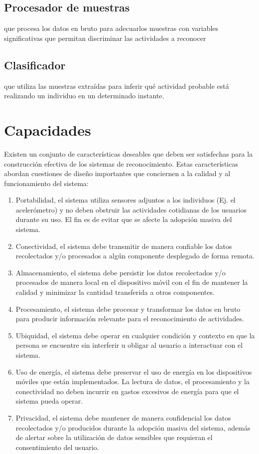 \subsection{Procesador de muestras}

que procesa los datos en bruto para adecuarlos muestras con variables
significativas que permitan discriminar las actividades a reconocer

\subsection{Clasificador}

que utiliza las muestras extraídas para inferir qué actividad probable
está realizando un individuo en un determinado instante.

\section{Capacidades}

Existen un conjunto de características deseables que deben ser satisfechas
para la construcción efectiva de los sistemas de reconocimiento. Estas
características abordan cuestiones de diseño importantes que conciernen
a la calidad y al funcionamiento del sistema:
\begin{enumerate}
\item Portabilidad, el sistema utiliza sensores adjuntos a los individuos
(Ej. el acelerómetro) y no deben obstruir las actividades cotidianas
de los usuarios durante su uso. El fin es de evitar que se afecte
la adopción masiva del sistema. 
\item Conectividad, el sistema debe transmitir de manera confiable los datos
recolectados y/o procesados a algún componente desplegado de forma
remota. 
\item Almacenamiento, el sistema debe persistir los datos recolectados y/o
procesados de manera local en el dispositivo móvil con el fin de mantener
la calidad y minimizar la cantidad transferida a otros componentes.
\item Procesamiento, el sistema debe procesar y transformar los datos en
bruto para producir información relevante para el reconocimiento de
actividades.
\item Ubiquidad, el sistema debe operar en cualquier condición y contexto
en que la persona se encuentre sin interferir u obligar al usuario
a interactuar con el sistema.
\item Uso de energía, el sistema debe preservar el uso de energía en los
dispositivos móviles que están implementados. La lectura de datos,
el procesamiento y la conectividad no deben incurrir en gastos excesivos
de energía para que el sistema pueda operar.
\item Privacidad, el sistema debe mantener de manera confidencial los datos
recolectados y/o producidos durante la adopción masiva del sistema,
además de alertar sobre la utilización de datos sensibles que requieran
el consentimiento del usuario.
\end{enumerate}

